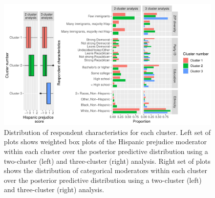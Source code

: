 \begin{figure}[t!]
\centering {}
\includegraphics[width=\textwidth]{figures/mod_plot2.pdf}
\caption{Distribution of respondent characteristics for each cluster.
  Left set of plots shows weighted box plots of the Hispanic prejudice
  moderator within each cluster over the posterior predictive
  distribution using a two-cluster (left) and three-cluster (right)
  analysis.  Right set of plots shows the distribution of categorical
  moderators within each cluster over the posterior predictive
  distribution using a two-cluster (left) and three-cluster (right)
  analysis.  } \label{fig:mod2}
\end{figure}


